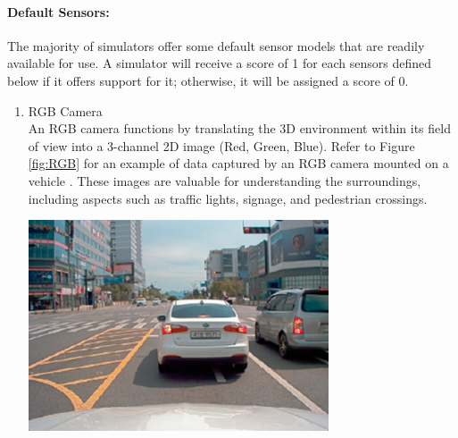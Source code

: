 \documentclass[12pt,twoside,a4paper,parskip]{scrbook} %
\begin{document}
\paragraph*{Default Sensors:}
The majority of simulators offer some default sensor models that are readily available for use. A simulator will receive a score of 1 for each sensors defined below if it offers support for it; otherwise, it will be assigned a score of 0.
\begin{enumerate}[label=\alph*.]
    \item RGB Camera \\
    An RGB camera functions by translating the 3D environment within its field of view into a 3-channel 2D image (Red, Green, Blue). Refer to Figure \ref{fig:RGB} for an example of data captured by an RGB camera mounted on a vehicle  \cite{senimage}. These images are valuable for understanding the surroundings, including aspects such as traffic lights, signage, and pedestrian crossings.

    
    \begin{minipage}[t]{\linewidth}
        \centering
        \includegraphics[width=0.70\textwidth]{Images/RGB.png}
        \label{fig:RGB}
        \vspace{-\baselineskip} %
    \end{minipage}
    \hfill
    

\end{enumerate}
\end{document}
